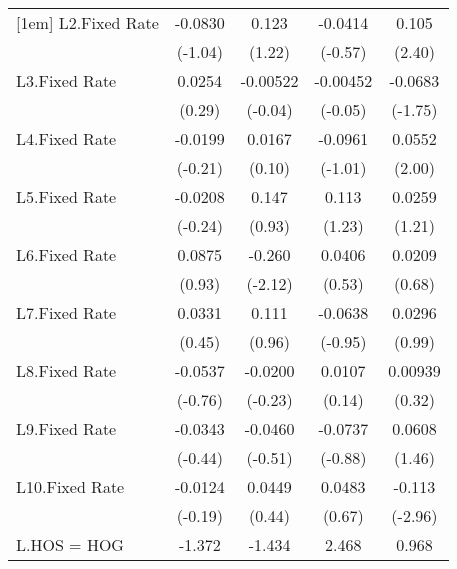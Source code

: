 {\begin{longtable}{l*{4}{c}}
[1em]
L2.Fixed Rate   &  -0.0830         &    0.123         &  -0.0414         &    0.105\sym{*}  \\
                &  (-1.04)         &   (1.22)         &  (-0.57)         &   (2.40)         \\
[1em]
L3.Fixed Rate   &   0.0254         & -0.00522         & -0.00452         &  -0.0683         \\
                &   (0.29)         &  (-0.04)         &  (-0.05)         &  (-1.75)         \\
[1em]
L4.Fixed Rate   &  -0.0199         &   0.0167         &  -0.0961         &   0.0552\sym{*}  \\
                &  (-0.21)         &   (0.10)         &  (-1.01)         &   (2.00)         \\
[1em]
L5.Fixed Rate   &  -0.0208         &    0.147         &    0.113         &   0.0259         \\
                &  (-0.24)         &   (0.93)         &   (1.23)         &   (1.21)         \\
[1em]
L6.Fixed Rate   &   0.0875         &   -0.260\sym{*}  &   0.0406         &   0.0209         \\
                &   (0.93)         &  (-2.12)         &   (0.53)         &   (0.68)         \\
[1em]
L7.Fixed Rate   &   0.0331         &    0.111         &  -0.0638         &   0.0296         \\
                &   (0.45)         &   (0.96)         &  (-0.95)         &   (0.99)         \\
[1em]
L8.Fixed Rate   &  -0.0537         &  -0.0200         &   0.0107         &  0.00939         \\
                &  (-0.76)         &  (-0.23)         &   (0.14)         &   (0.32)         \\
[1em]
L9.Fixed Rate   &  -0.0343         &  -0.0460         &  -0.0737         &   0.0608         \\
                &  (-0.44)         &  (-0.51)         &  (-0.88)         &   (1.46)         \\
[1em]
L10.Fixed Rate  &  -0.0124         &   0.0449         &   0.0483         &   -0.113\sym{**} \\
                &  (-0.19)         &   (0.44)         &   (0.67)         &  (-2.96)         \\
[1em]
L.HOS = HOG     &   -1.372         &   -1.434         &    2.468         &    0.968\sym{*}  \\

\end{longtable}}

